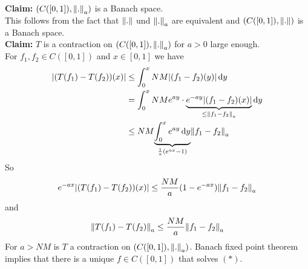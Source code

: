 \begin{beispiel}
	\textbf{Claim:} \text{    }     $(C([0,1]), \norm{.}_a)$ is a Banach space. \\
	This follows from the fact that $\norm{.}$ und $\norm{.}_a$ are equivalent and $(C([0,1]),\norm{.})$ is a Banach space. \\
	\textbf{Claim:} \text{    }     $T$ is a contraction on $(C([0,1]),\norm{.}_a)$ for $a >0$ large enough. \\
	For $f_1,f_2 \in C([0,1])$ and $x \in [0,1]$ we have
	\begin{align*}
		\abs{(T(f_1)-T(f_2))(x)} &\leq \int_{0}^{x} NM \abs{(f_1-f_2)(y)} \,\mathrm{d}y \\
		&= \int_{0}^{x}NM e^{ay} \cdot \underset{\leq \norm{f_1-f_2}_a}{\underbrace{e^{-ay} \abs{(f_1-f_2)(x)}}} \,\mathrm{d}y \\
		&\leq NM \underset{\frac{1}{a}(e^{ax}-1)}{\underbrace{\int_{0}^{x} e^{ay} \,\mathrm{d}y}} \norm{f_1-f_2}_a 
	\end{align*}
	So
	\[
		e^{-ax} \abs{(T(f_1)-T(f_2))(x)} \leq \frac{NM}{a}(1-e^{-ax})\norm{f_1-f_2}_a
	\]
	and
	\[
		\norm{T(f_1)-T(f_2)}_a \leq  \frac{NM}{a} \norm{f_1-f_2}_a
	\]
	For $a > NM$ is $T$ a contraction on $(C([0,1]),\norm{.}_a)$. Banach fixed point theorem implies that there is a unique $f \in C([0,1])$ that solves $(*)$.
\end{beispiel}
